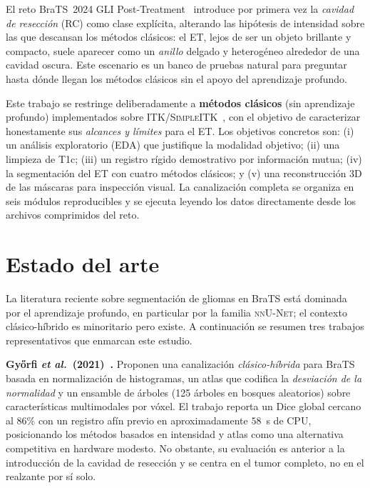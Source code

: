 \documentclass[conference]{IEEEtran}
\begin{document}
El reto BraTS~2024 GLI Post-Treatment~\cite{deverdier2024brats,baid2021brats}
introduce por primera vez la \emph{cavidad de resección} (RC) como
clase explícita, alterando las hipótesis de intensidad sobre las que
descansan los métodos clásicos: el ET, lejos de ser un objeto
brillante y compacto, suele aparecer como un \emph{anillo} delgado
y heterogéneo alrededor de una cavidad oscura. Este escenario es
un banco de pruebas natural para preguntar hasta dónde llegan los
métodos clásicos sin el apoyo del aprendizaje profundo.

Este trabajo se restringe deliberadamente a \textbf{métodos
clásicos} (sin aprendizaje profundo) implementados sobre
\textsc{ITK/SimpleITK}~\cite{lloyd2010itk}, con el objetivo de
caracterizar honestamente sus \emph{alcances y límites} para el ET.
Los objetivos concretos son: (i) un análisis exploratorio (EDA)
que justifique la modalidad objetivo; (ii) una limpieza de T1c;
(iii) un registro rígido demostrativo por información mutua;
(iv) la segmentación del ET con cuatro métodos clásicos; y
(v) una reconstrucción 3D de las máscaras para inspección visual.
La canalización completa se organiza en seis módulos reproducibles
y se ejecuta leyendo los datos directamente desde los archivos
comprimidos del reto.

\section{Estado del arte}
La literatura reciente sobre segmentación de gliomas en BraTS está
dominada por el aprendizaje profundo, en particular por la
familia \textsc{nnU-Net}; el contexto clásico-híbrido es minoritario
pero existe. A continuación se resumen tres trabajos representativos
que enmarcan este estudio.

\textbf{Győrfi \emph{et al.}~(2021)~\cite{gyorfi2021ensemble}.}
Proponen una canalización \emph{clásico-híbrida} para BraTS basada
en normalización de histogramas, un atlas que codifica la
\emph{desviación de la normalidad} y un ensamble de árboles
(125 árboles en bosques aleatorios) sobre características
multimodales por vóxel. El trabajo reporta un Dice global cercano
al $86\%$ con un registro afín previo en aproximadamente
$58$~s de CPU, posicionando los métodos basados en intensidad y
atlas como una alternativa competitiva en hardware modesto. No
obstante, su evaluación es anterior a la introducción de la
cavidad de resección y se centra en el tumor completo, no en el
realzante por sí solo.
\end{document}
